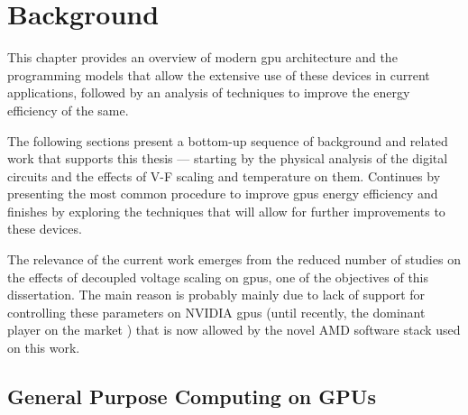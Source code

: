 
\chapter{Background}
\label{chapter:background}

This chapter provides an overview of modern \acrshort{gpu} architecture and the programming models that allow the extensive use of these devices in current applications, followed by an analysis of techniques to improve the energy efficiency of the same. 

The following sections present a bottom-up sequence of background and related work that supports this thesis — starting by the physical analysis of the digital circuits and the effects of V-F scaling and temperature on them. Continues by presenting the most common procedure to improve \acrshort{gpu}s energy efficiency and finishes by exploring the techniques that will allow for further improvements to these devices. 

The relevance of the current work emerges from the reduced number of studies on the effects of decoupled voltage scaling on \acrshort{gpu}s, one of the objectives of this dissertation. The main reason is probably mainly due to lack of support for controlling these parameters on NVIDIA \acrshort{gpu}s (until recently, the dominant player on the market \cite{noauthor_jon_2018, mujtaba_amd_2019}) that is now allowed by the novel AMD software stack used on this work.






\section{General Purpose Computing on GPUs}
\label{section:gpp_gpu}

